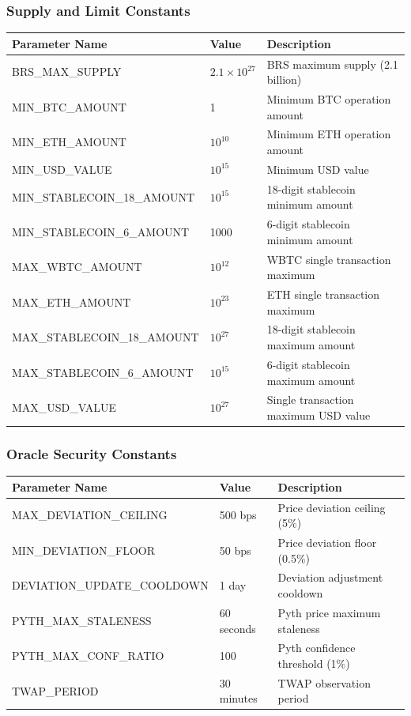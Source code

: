 \documentclass{article}
\begin{document}
\subsubsection{Supply and Limit Constants}

{\small
\begin{center}
\begin{longtable}{p{6.5cm}p{3cm}p{4.5cm}}
\toprule
Parameter Name & Value & Description \\
\midrule
\endhead
BRS\_MAX\_SUPPLY & $2.1 \times 10^{27}$ & BRS maximum supply (2.1 billion) \\
MIN\_BTC\_AMOUNT & 1 & Minimum BTC operation amount \\
MIN\_ETH\_AMOUNT & $10^{10}$ & Minimum ETH operation amount \\
MIN\_USD\_VALUE & $10^{15}$ & Minimum USD value \\
MIN\_STABLECOIN\_18\_AMOUNT & $10^{15}$ & 18-digit stablecoin minimum amount \\
MIN\_STABLECOIN\_6\_AMOUNT & 1000 & 6-digit stablecoin minimum amount \\
MAX\_WBTC\_AMOUNT & $10^{12}$ & WBTC single transaction maximum \\
MAX\_ETH\_AMOUNT & $10^{23}$ & ETH single transaction maximum \\
MAX\_STABLECOIN\_18\_AMOUNT & $10^{27}$ & 18-digit stablecoin maximum amount \\
MAX\_STABLECOIN\_6\_AMOUNT & $10^{15}$ & 6-digit stablecoin maximum amount \\
MAX\_USD\_VALUE & $10^{27}$ & Single transaction maximum USD value \\
\bottomrule
\end{longtable}
\end{center}
}

\subsubsection{Oracle Security Constants}

{\small
\begin{center}
\begin{longtable}{p{6.5cm}p{3cm}p{4.5cm}}
\toprule
Parameter Name & Value & Description \\
\midrule
\endhead
MAX\_DEVIATION\_CEILING & 500 bps & Price deviation ceiling (5\%) \\
MIN\_DEVIATION\_FLOOR & 50 bps & Price deviation floor (0.5\%) \\
DEVIATION\_UPDATE\_COOLDOWN & 1 day & Deviation adjustment cooldown \\
PYTH\_MAX\_STALENESS & 60 seconds & Pyth price maximum staleness \\
PYTH\_MAX\_CONF\_RATIO & 100 & Pyth confidence threshold (1\%) \\
TWAP\_PERIOD & 30 minutes & TWAP observation period \\
\bottomrule
\end{longtable}
\end{center}
}
\end{document}

